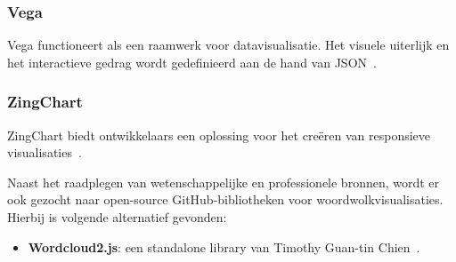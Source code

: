 \subsubsection{Vega}
Vega functioneert als een raamwerk voor datavisualisatie. Het visuele uiterlijk en het interactieve gedrag wordt gedefinieerd aan de hand van JSON~\autocite{Chandra2022}. 
\subsubsection{ZingChart}
ZingChart biedt ontwikkelaars een oplossing voor het creëren van responsieve visualisaties~\autocite{Chandra2022}.
\medskip\par
Naast het raadplegen van wetenschappelijke en professionele bronnen, wordt er ook gezocht naar open-source GitHub-bibliotheken voor woordwolkvisualisaties. Hierbij is volgende alternatief gevonden:
\begin{itemize}
    \item \textbf{Wordcloud2.js}: een standalone library van Timothy Guan-tin Chien~\autocite{Chien2011}.
\end{itemize}

